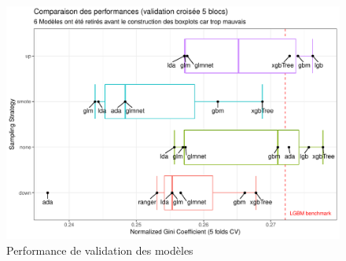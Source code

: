 \documentclass[french]{article}
\begin{document}
\begin{multicols}{2}
\begin{figure}[H] \centering
  \includegraphics[width = \columnwidth]{img/results}
  \caption{Performance de validation des modèles}
\end{figure}

\nocite{*}



\end{multicols}
\end{document}
